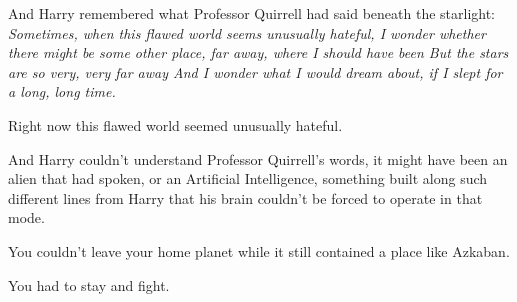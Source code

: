 And Harry remembered what Professor Quirrell had said beneath the starlight:
\emph{Sometimes, when this flawed world seems unusually hateful, I wonder
whether there might be some other place, far away, where I should have
been{\el} But the stars are so very, very far away{\el} And I wonder what
I would dream about, if I slept for a long, long time.}

Right now this flawed world seemed unusually hateful.

And Harry couldn't understand Professor Quirrell's words, it might have been an
alien that had spoken, or an Artificial Intelligence, something built along
such different lines from Harry that his brain couldn't be forced to operate in
that mode.

You couldn't leave your home planet while it still contained a place like
Azkaban.

You had to stay and fight.
